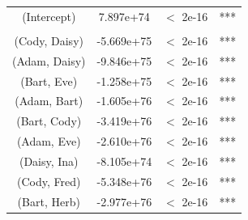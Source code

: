 \begin{table}[t!]
\begin{tabular}{cccc}
%
(Intercept)            &  7.897e+74 &  $<$ 2e-16 & ***\\
\\
(Cody, Daisy)  &  	-5.669e+75  &  $<$ 2e-16 & ***\\
(Adam, Daisy)  &   -9.846e+75  &   $<$ 2e-16 &***\\
(Bart, Eve)  	&   -1.258e+75  &$<$ 2e-16 &***\\
(Adam, Bart)  	&   -1.605e+76  & $<$ 2e-16 &***\\
(Bart, Cody)  	&   -3.419e+76  & $<$ 2e-16 &***\\
(Adam, Eve)  	&   -2.610e+76  & $<$ 2e-16 &***\\
(Daisy, Ina)  	&  	-8.105e+74 	 &  $<$ 2e-16 &***\\
(Cody, Fred)  	&   -5.348e+76  &$<$ 2e-16 &***\\
(Bart, Herb)  	&   -2.977e+76  &$<$ 2e-16 &***\\

\end{tabular}
\end{table}
